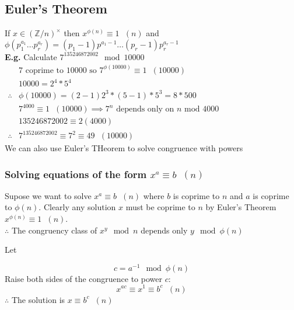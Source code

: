 \documentclass[11pt]{article}
\begin{document}
\subsection{Euler's Theorem}
If $x \in (\mathbb{Z}/n)^\times $ then $x^{\phi{(n)}} \equiv 1\hspace{7pt} (n) $ and $	\phi(p_1^{a_1} \dots p_r^{a_r}) = (p_1-1) p^{a_1 -1} \dots (p_r-1)p_r^{a_r-1}$\\ \vspace{7pt}
\textbf{E.g.} Calculate $7^{135246872002} \mod 10000$ 
\begin{align*}
	&7 \text{ coprime to  10000 so } 7^{\phi(10000)} \equiv 1\hspace{7pt} (10000) \hspace{180pt}\\
	& 10000 = 2^4 *5^4\\
	\therefore &\phi(10000) = (2-1)2^3 * (5-1)*5^3 = 8*500\\
	&7^{4000} \equiv 1 \hspace{7pt}(10000) \implies 7^n \text{ depends only on } n \text{ mod 4000}\\
	&135246872002 \equiv 2 (4000)\\
	\therefore& 7^{135246872002} \equiv 7^2 \equiv 49\hspace{7pt} (10000)
\end{align*}
We can also use Euler's THeorem to solve congruence with powers
\newpage
\subsubsection{Solving equations of the form $x^{a} \equiv b \hspace{7pt} (n)$}


Supose we want to solve $x^a \equiv b\hspace{7pt} (n)$ where $b$ is coprime to $ n$ and $a$ is coprime to $\phi(n)$. Clearly any solution $x$ must be coprime to $n$ by Euler's Theorem $x^{\phi(n)} \equiv 1\hspace{7pt} (n)$.\\
$\therefore$ The congruency class of $x^y \mod n $ depends only $y \mod \phi(n)$ \\ \vspace{7pt}

Let 

\begin{equation*}
	c =a^{-1} \mod \phi(n)
\end{equation*}
Raise both sides of the congruence to power $c$:
\begin{equation*}
	x^{ac} \equiv x^1 \equiv b^c\hspace{7pt} (n) 
\end{equation*}
$\therefore $ The solution is $x \equiv b^c \hspace{7pt} (n)$
\\[1em]
\end{document}
